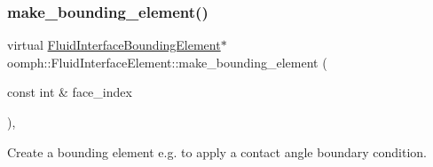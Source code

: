 \mbox{\label{classoomph_1_1FluidInterfaceElement_a376f8d1d451890b5725c7a991c34b6fc}} 
\subsubsection{\texorpdfstring{make\+\_\+bounding\+\_\+element()}{make\_bounding\_element()}}
{\footnotesize\ttfamily virtual \hyperlink{classoomph_1_1FluidInterfaceBoundingElement}{Fluid\+Interface\+Bounding\+Element}$\ast$ oomph\+::\+Fluid\+Interface\+Element\+::make\+\_\+bounding\+\_\+element (\begin{DoxyParamCaption}\item[{const int \&}]{face\+\_\+index }\end{DoxyParamCaption})\hspace{0.3cm}{\ttfamily [inline]}, {\ttfamily [virtual]}}



Create a bounding element e.\+g. to apply a contact angle boundary condition. 



